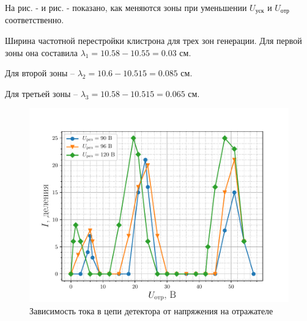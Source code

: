 На рис. -  и рис. - показано, как меняются зоны при уменьшении $U_{\text{уск}}$ и $U_{\text{отр}}$ соответственно. 

Ширина частотной перестройки клистрона для трех зон генерации.
Для первой зоны она составила $\lambda_1=10.58-10.55=0.03$ см.

Для второй зоны -- $\lambda_2=10.6-10.515=0.085$ см.

Для третьей зоны -- $\lambda_3=10.58-10.515=0.065$ см.


\begin{figure}[H]
		\centering
		\includegraphics[width=\linewidth]{fig/task3a}
		\caption{Зависимость тока в цепи детектора от напряжения на отражателе}
		\label{fig:task3a}
\end{figure}
 
